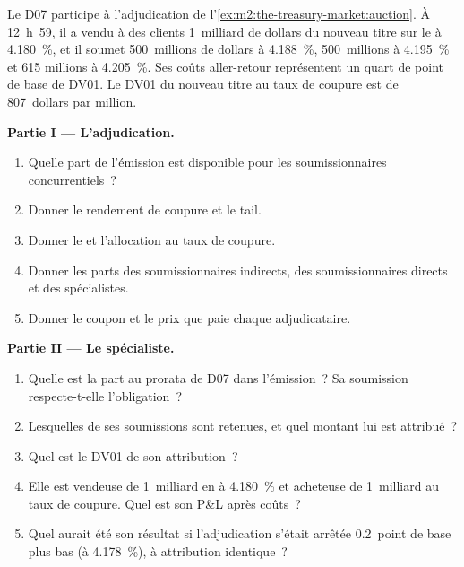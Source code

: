 \begin{problem}\label{pb:m2:the-treasury-market:1}
Le  D07 participe à l'adjudication de l'\cref{ex:m2:the-treasury-market:auction}.
À 12~h~59, il a vendu à des clients 1~milliard de dollars du nouveau titre sur le  à 4.180~\%, et il
soumet 500~millions de dollars à 4.188~\%, 500~millions à 4.195~\% et 615
millions à 4.205~\%. Ses coûts aller-retour représentent un quart de point de base de
DV01. Le DV01 du nouveau titre au taux de coupure est de 807~dollars par million.

\medskip\noindent\textbf{Partie I --- L'adjudication.}
\begin{enumerate}
\item Quelle part de l'émission est disponible pour les soumissionnaires concurrentiels~?
\item Donner le rendement de coupure et le tail.
\item Donner le  et l'allocation au taux de coupure.
\item Donner les parts des soumissionnaires indirects, des soumissionnaires directs et des spécialistes.
\item Donner le coupon et le prix que paie chaque adjudicataire.
\end{enumerate}

\medskip\noindent\textbf{Partie II --- Le spécialiste.}
\begin{enumerate}[resume]
\item Quelle est la part au prorata de D07 dans l'émission~? Sa soumission respecte-t-elle
l'obligation~?
\item Lesquelles de ses soumissions sont retenues, et quel montant lui est attribué~?
\item Quel est le DV01 de son attribution~?
\item Elle est vendeuse de 1~milliard en  à 4.180~\% et acheteuse de 1~milliard au
taux de coupure. Quel est son P\&L après coûts~?
\item Quel aurait été son résultat si l'adjudication s'était arrêtée 0.2~point de base plus bas
(à 4.178~\%), à attribution identique~?
\end{enumerate}


\end{problem}
